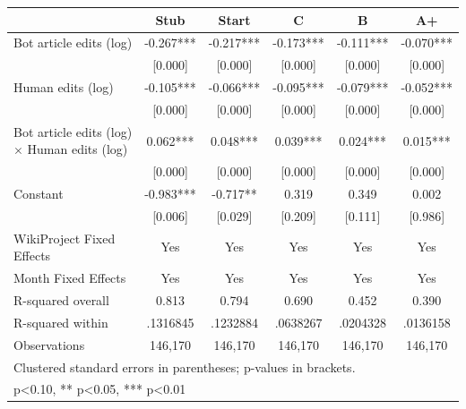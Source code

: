 {
\def\sym#1{\ifmmode^{#1}\else\(^{#1}\)\fi}
\begin{tabular}{l*{5}{c}}
\toprule
                    &\multicolumn{1}{c}{Stub}&\multicolumn{1}{c}{Start}&\multicolumn{1}{c}{C}&\multicolumn{1}{c}{B}&\multicolumn{1}{c}{A+}\\
\midrule
Bot article edits (log)&    -0.267***&    -0.217***&    -0.173***&    -0.111***&    -0.070***\\
                    &   [0.000]   &   [0.000]   &   [0.000]   &   [0.000]   &   [0.000]   \\
Human edits (log)   &    -0.105***&    -0.066***&    -0.095***&    -0.079***&    -0.052***\\
                    &   [0.000]   &   [0.000]   &   [0.000]   &   [0.000]   &   [0.000]   \\
Bot article edits (log) $\times$ Human edits (log)&     0.062***&     0.048***&     0.039***&     0.024***&     0.015***\\
                    &   [0.000]   &   [0.000]   &   [0.000]   &   [0.000]   &   [0.000]   \\
Constant            &    -0.983***&    -0.717** &     0.319   &     0.349   &     0.002   \\
                    &   [0.006]   &   [0.029]   &   [0.209]   &   [0.111]   &   [0.986]   \\
WikiProject Fixed Effects&       Yes   &       Yes   &       Yes   &       Yes   &       Yes   \\
Month Fixed Effects &       Yes   &       Yes   &       Yes   &       Yes   &       Yes   \\
\midrule
R-squared overall   &     0.813   &     0.794   &     0.690   &     0.452   &     0.390   \\
R-squared within    &  .1316845   &  .1232884   &  .0638267   &  .0204328   &  .0136158   \\
Observations        &   146,170   &   146,170   &   146,170   &   146,170   &   146,170   \\
\bottomrule
\multicolumn{6}{l}{\footnotesize Clustered standard errors in parentheses; p-values in brackets.}\\
\multicolumn{6}{l}{\footnotesize * p<0.10, ** p<0.05, *** p<0.01}\\
\end{tabular}
}
